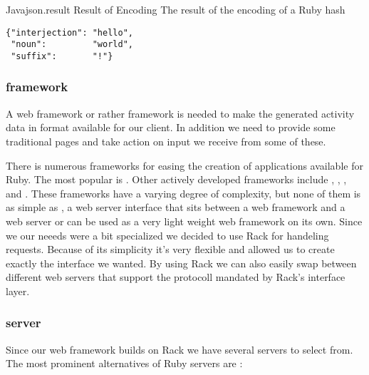 \begin{scode}{Java}{json.result}{%
  Result of  Encoding}{%
  The result of the  encoding of a Ruby hash}
\begin{lstlisting}
{"interjection": "hello",
 "noun":         "world",
 "suffix":       "!"}
\end{lstlisting}
\end{scode}

\subsubsection{ framework}

A web framework or rather  framework is needed to make the
generated activity data in  format available for our client.
In addition we need to provide some traditional  pages and
take action on input we receive from some of these.

There is numerous frameworks for easing the creation of 
applications available for Ruby. The most popular%
is %
.
Other actively developed frameworks include
,
,
, and
.%
These frameworks have a varying degree of complexity, but none of them
is as simple as %
,
a web server interface that sits between a web framework and a web
server or can be used as a very light weight web framework on its own.
Since we our neeeds were a bit specialized we decided to use Rack for
handeling  requests. Because of its simplicity it's very
flexible and allowed us to create exactly the  interface
we wanted. By using Rack we can also easily swap between different
web servers that support the protocoll mandated by Rack's interface layer.

\subsubsection{ server}

Since our web framework builds on Rack we have several
 servers to select from. The most prominent alternatives
of Ruby servers are%
:

